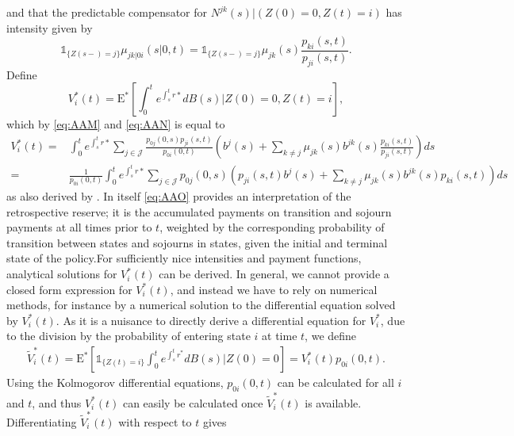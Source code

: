 \documentclass[12pt]{article}
\newcommand{\E}{\text{E}}
\newcommand{\indic}[1]{\mathds{1}_{ \{ #1 \} }}
\theoremstyle{my_thm}
\begin{document}
and that the predictable compensator for $N^{jk}(s)| (Z(0)=0, Z(t)=i )$ has intensity given by
\begin{equation}
\indic{Z(s-)=j}\mu_{jk|0i}(s|0,t)=\indic{Z(s-)=j}\mu_{jk}(s)\frac{p_{ki}(s,t)}{p_{ji}(s,t)}. \label{eq:AAN}
\end{equation}
Define
$$
V_i^*(t)= \E^* \left[ \int_0^t e^{\int_s^t r*} dB(s) \big|Z(0)=0, Z(t)=i \right],
$$
which by \eqref{eq:AAM} and \eqref{eq:AAN} is equal to
\begin{align}
V_i^*(t)=& \int_0^t e^{\int_s^t r*} \sum_{j \in \mathcal{J}} \frac{p_{0j}(0,s)p_{ji}(s,t)}{p_{0i}(0,t)} \left(  b^{j}(s) + \sum_{k \neq j}  \mu_{jk}(s) b^{jk}(s)\frac{p_{ki}(s,t)}{p_{ji}(s,t)} \right) ds
 \nonumber \\
=&
 \frac{1}{p_{0i}(0,t)}\int_0^t e^{\int_s^t r*} \sum_{j \in \mathcal{J}} p_{0j}(0,s) \left(p_{ji}(s,t)   b^{j}(s) + \sum_{k \neq j}  \mu_{jk}(s) b^{jk}(s) p_{ki}(s,t) \right) ds \label{eq:AAO}
\end{align}
as also derived by \citet{Norberg}. In itself \eqref{eq:AAO} provides an interpretation of the retrospective reserve; it is the accumulated payments on transition and sojourn payments at all times prior to $t$, weighted by the corresponding probability of transition between states and sojourns in states, given the initial and terminal state of the policy.For sufficiently nice intensities and payment functions, analytical solutions for $V_i^*(t)$ can be derived. In general, we cannot provide a closed form expression for $V_i^*(t)$, and instead we have to rely on numerical methods, for instance by a numerical solution to the differential equation solved by $V_i^*(t)$. As it is a nuisance to directly derive a differential equation for $V_i^*$, due to the division by the probability of entering state $i$ at time $t$, we define
\begin{align*}
\tilde{V}_i^*(t)= \E^* \left[ \indic{Z(t)=i} \int_0^t e^{\int_s^t r^*} dB(s) \big|Z(0)=0\right] = V_i^*(t)p_{0i}(0,t).
\end{align*}
Using the Kolmogorov differential equations, $p_{0i}(0,t)$ can be calculated for all $i$ and $t$, and thus $V_i^*(t)$ can easily be calculated once $\tilde{V}_i^*(t)$ is available. Differentiating $\tilde{V}_i^*(t)$ with respect to $t$ gives
\end{document}
